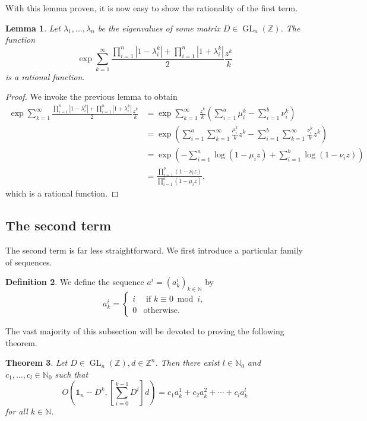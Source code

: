 \documentclass[a4paper]{article}
\theoremstyle{plain}
\newtheorem{theorem}{Theorem}[section]
\newtheorem{lemma}[theorem]{Lemma}
\theoremstyle{definition}
\newtheorem{defn}[theorem]{Definition}
\theoremstyle{remark}
\DeclareMathOperator{\GL}{GL}
\newcommand{\I}{\mathds{1}}
\newcommand{\NN}{{\mathbb{N}}}
\newcommand{\ZZ}{{\mathbb{Z}}}
\begin{document}
With this lemma proven, it is now easy to show the rationality of the first term.
\begin{lemma}
	\label{lem:part1}
	Let \(\lambda_1, \dots, \lambda_n\) be the eigenvalues of some matrix \(D \in \GL_n(\ZZ)\). The function
	\begin{equation*}
	\exp \sum_{k=1}^{\infty}
	\frac{\prod_{i=1}^{n}|1-\lambda_i^k|+\prod_{i=1}^{n}|1+\lambda_i^k|}{2}\frac{z^k}{k}
	\end{equation*}
	is a rational function.
\end{lemma}
\begin{proof}
	We invoke the previous lemma to obtain
	\begin{align*}
	\exp \sum_{k=1}^{\infty}
\frac{\prod_{i=1}^{n}|1-\lambda_i^k|+\prod_{i=1}^{n}|1+\lambda_i^k|}{2}\frac{z^k}{k}
	&= \exp \sum_{k=1}^{\infty}\frac{z^k}{k} \left(\sum_{i=1}^{a} \mu_i^k - \sum_{i=1}^b \nu_i ^k\right)\\
	&= \exp \left(\sum_{i=1}^{a}\sum_{k=1}^{\infty} \frac{\mu_i^k}{k}z^k - \sum_{i=1}^{b}\sum_{k=1}^{\infty} \frac{\nu_i^k}{k}z^k  \right)\\
	&= \exp \left(- \sum_{i=1}^{a}\log(1-\mu_i z) +  \sum_{i=1}^{b}\log(1-\nu_i z) \right)\\
	&= \frac{ \prod_{i=1}^{b}(1-\nu_i z)}{\prod_{i=1}^{a}(1-\mu_i z)},
	\end{align*}
	which is a rational function.
\end{proof}

\subsection{The second term}
The second term is far less straightforward. We first introduce a particular family of sequences.
\begin{defn}
	We define the sequence \(a^i = (a^i_k)_{k \in \NN}\) by
	\begin{equation*}
	a^i_k =  \begin{cases}
	i & \text{ if }k \equiv 0 \bmod i,\\
	0 & \text{otherwise.}
	\end{cases}
	\end{equation*}
\end{defn}
The vast majority of this subsection will be devoted to proving the following theorem.
\begin{theorem}
	\label{thm:Oissumsequences}
	Let \(D \in \GL_n(\ZZ), d \in \ZZ^n\). Then there exist \(l \in \NN_0\) and \(c_1, \dots, c_l \in \NN_0\) such that
	\begin{equation*}
	 O\left(\I_n-D^k,\left[\sum_{i=0}^{k-1}D^i\right] d\right)  = c_1 a^1_k + c_2 a^2_k + \cdots + c_l a^l_k
	\end{equation*}
	for all \(k \in \NN \).
\end{theorem}
\end{document}
